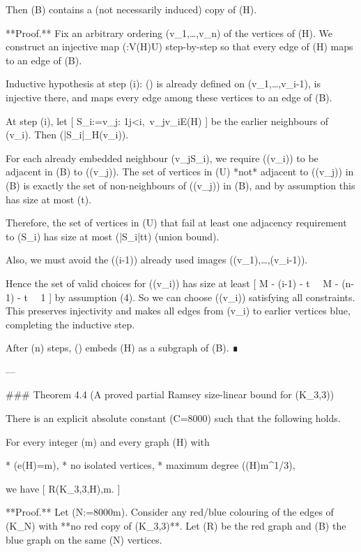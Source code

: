 Then (B) contains a (not necessarily induced) copy of (H).

**Proof.**
Fix an arbitrary ordering (v_1,\dots,v_n) of the vertices of (H). We construct an injective map (\varphi:V(H)\to U) step-by-step so that every edge of (H) maps to an edge of (B).

Inductive hypothesis at step (i): (\varphi) is already defined on ({v_1,\dots,v_{i-1}}), is injective there, and maps every edge among these vertices to an edge of (B).

At step (i), let
[
S_i:={v_j: 1\le j<i,\ v_jv_i\in E(H)}
]
be the earlier neighbours of (v_i). Then (|S_i|\le \deg_H(v_i)\le \Delta).

For each already embedded neighbour (v_j\in S_i), we require (\varphi(v_i)) to be adjacent in (B) to (\varphi(v_j)). The set of vertices in (U) *not* adjacent to (\varphi(v_j)) in (B) is exactly the set of non-neighbours of (\varphi(v_j)) in (B), and by assumption this has size at most (t).

Therefore, the set of vertices in (U) that fail at least one adjacency requirement to (S_i) has size at most (|S_i|t\le \Delta t) (union bound).

Also, we must avoid the ((i-1)) already used images (\varphi(v_1),\dots,\varphi(v_{i-1})).

Hence the set of valid choices for (\varphi(v_i)) has size at least
[
M - (i-1) - \Delta t \ \ge\ M - (n-1) - \Delta t \ \ge\ 1
]
by assumption (4). So we can choose (\varphi(v_i)) satisfying all constraints. This preserves injectivity and makes all edges from (v_i) to earlier vertices blue, completing the inductive step.

After (n) steps, (\varphi) embeds (H) as a subgraph of (B). ∎

---

### Theorem 4.4 (A proved partial Ramsey size-linear bound for (K_{3,3}))

There is an explicit absolute constant (C=8000) such that the following holds.

For every integer (m) and every graph (H) with

* (e(H)=m),
* no isolated vertices,
* maximum degree (\Delta(H)\le m^{1/3}),

we have
[
R(K_{3,3},H),m.
]

**Proof.**
Let (N:=8000m). Consider any red/blue colouring of the edges of (K_N) with **no red copy of (K_{3,3})**. Let (R) be the red graph and (B) the blue graph on the same (N) vertices.

